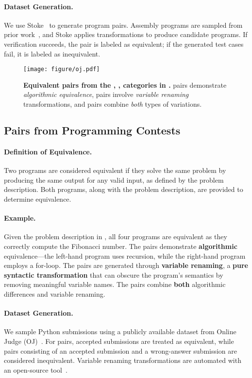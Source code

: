 \paragraph{Dataset Generation.} We use Stoke~\cite{schkufza2013stochastic}  to generate program pairs. Assembly programs are sampled from prior work~\cite{koenig2021adaptive}, and Stoke applies transformations to produce candidate programs. If verification succeeds, the pair is labeled as equivalent; if the generated test cases fail, it is labeled as inequivalent.


\begin{figure}[!tb]
\centering
\texttt{[image: figure/oj.pdf]}
\caption{\textbf{Equivalent pairs from the \oja, \ojv, \ojva categories in \name.} \oja pairs demonstrate \emph{algorithmic equivalence}, \ojv pairs involve \emph{variable renaming} transformations, and \ojva pairs combine \emph{both} types of variations.}
\label{fig:oj}
\end{figure}


\subsection{Pairs from Programming Contests}
\label{subsec:oj}

\paragraph{Definition of Equivalence.} Two programs are considered equivalent if they solve the same problem by producing the same output for any valid input, as defined by the problem description. Both programs, along with the problem description, are provided to determine equivalence.

\paragraph{Example.} Given the problem description in , all four programs are equivalent as they correctly compute the Fibonacci number. The \textbf{\oja} pairs demonstrate \textbf{algorithmic} equivalence—the left-hand program uses recursion, while the right-hand program employs a for-loop. The \textbf{\ojv} pairs are generated through \textbf{variable renaming}, a \textbf{pure syntactic transformation} that can obscure the program’s semantics by removing meaningful variable names. The \textbf{\ojva} pairs combine \textbf{both} algorithmic differences and variable renaming.

\paragraph{Dataset Generation.}
We sample Python submissions using a publicly available dataset from Online Judge (OJ)~\cite{puri2021codenet}. For \oja pairs, accepted submissions are treated as equivalent, while pairs consisting of an accepted submission and a wrong-answer submission are considered inequivalent. Variable renaming transformations are automated with an open-source tool~\cite{PythonTool}.